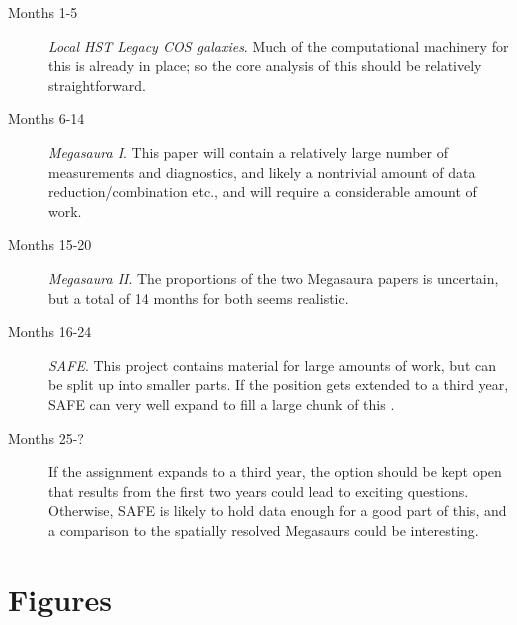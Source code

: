 \documentclass[10pt, letterpaper, headings=Large, DIV=14]{scrartcl}
\begin{document}
\begin{description}
	\item[Months 1-5] \emph{Local HST Legacy COS galaxies}. Much of the
		computational machinery for this is already in place; so the
		core analysis of this should be relatively straightforward. 
	\item[Months 6-14] \emph{Megasaura I}. This paper will contain a relatively
		large number of measurements and diagnostics, and likely a
		nontrivial amount of data reduction/combination etc., and will
		require a considerable amount of work.
	\item[Months 15-20] \emph{Megasaura II}. The proportions of the two Megasaura
		papers is uncertain, but a total of 14 months for both seems
		realistic. 
	\item[Months 16-24] \emph{SAFE}. This project contains material for large
		amounts of work, but can be split up into smaller parts. If the
		position gets extended to a third year, SAFE can very well
		expand to fill a large chunk of this .
	\item[Months 25-?] If the assignment expands to a third year, the option
		should be kept open that results from the first two years could
		lead to exciting questions. Otherwise, SAFE is likely to hold
		data enough for a good part of this, and a comparison to the
		spatially resolved Megasaurs could be interesting. 
\end{description}


\begin{scriptsize}
	
\end{scriptsize}

\section*{Figures}
\end{document}
